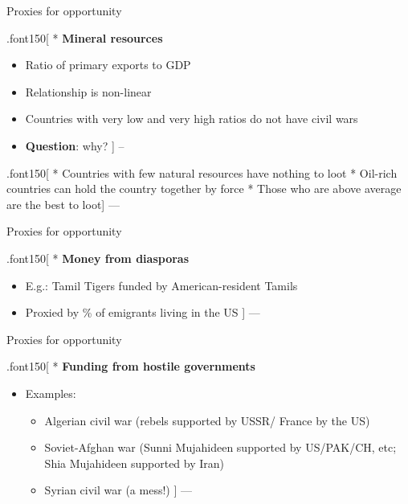 \documentclass[ignorenonframetext,]{beamer}
\providecommand{\tightlist}{%
  \setlength{\itemsep}{0pt}\setlength{\parskip}{0pt}}
\begin{document}
\begin{frame}{Proxies for opportunity}

.font150{[} * \textbf{Mineral resources}

\begin{itemize}
\item
  Ratio of primary exports to GDP
\item
  Relationship is non-linear
\item
  Countries with very low and very high ratios do not have civil wars
\item
  \textbf{Question}: why? {]} --
\end{itemize}

.font150{[} * Countries with few natural resources have nothing to loot
* Oil-rich countries can hold the country together by force * Those who
are above average are the best to loot{]} ---

\end{frame}

\begin{frame}{Proxies for opportunity}

.font150{[} * \textbf{Money from diasporas}

\begin{itemize}
\item
  E.g.: Tamil Tigers funded by American-resident Tamils
\item
  Proxied by \% of emigrants living in the US {]} ---
\end{itemize}

\end{frame}

\begin{frame}{Proxies for opportunity}

.font150{[} * \textbf{Funding from hostile governments}

\begin{itemize}
\tightlist
\item
  Examples:

  \begin{itemize}
  \tightlist
  \item
    Algerian civil war (rebels supported by USSR/ France by the US)
  \item
    Soviet-Afghan war (Sunni Mujahideen supported by US/PAK/CH, etc;
    Shia Mujahideen supported by Iran)
  \item
    Syrian civil war (a mess!) {]} ---
  \end{itemize}
\end{itemize}

\end{frame}
\end{document}

